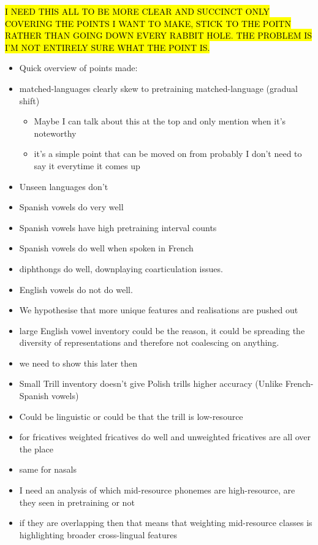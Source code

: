\hl{I NEED THIS ALL TO BE MORE CLEAR AND SUCCINCT ONLY COVERING THE POINTS I WANT TO MAKE, STICK TO THE POITN RATHER THAN GOING DOWN EVERY RABBIT HOLE. THE PROBLEM IS I'M NOT ENTIRELY SURE WHAT THE POINT IS.}

\begin{itemize}
    \item Quick overview of points made:
    \item matched-languages clearly skew to pretraining matched-language (gradual shift)
    \begin{itemize}
        \item Maybe I can talk about this at the top and only mention when it's noteworthy
        \item  it's a simple point that can be moved on from probably I don't need to say it everytime it comes up
    \end{itemize}
    \item Unseen languages don't
    \item Spanish vowels do very well
    \item Spanish vowels have high pretraining interval counts
    \item Spanish vowels do well when spoken in French
    \item diphthongs do well, downplaying coarticulation issues.
    \item English vowels do not do well.
    \item We hypothesise that more unique features and realisations are pushed out
    \item large English vowel inventory could be the reason, it could be spreading the diversity of representations and therefore not coalescing on anything.
    \item we need to show this later then
    \item Small Trill inventory doesn't give Polish trills higher accuracy (Unlike French-Spanish vowels)
    \item Could be linguistic or could be that the trill is low-resource
    \item for fricatives weighted fricatives do well and unweighted fricatives are all over the place
    \item same for nasals
    \item I need an analysis of which mid-resource phonemes are high-resource, are they seen in pretraining or not
    \item if they are overlapping then that means that weighting mid-resource classes is highlighting broader cross-lingual features

\end{itemize}
